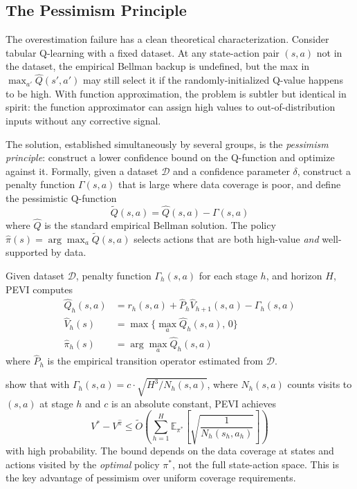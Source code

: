 \subsection{The Pessimism Principle}
\label{sec:pessimism}

The overestimation failure has a clean theoretical characterization. Consider tabular Q-learning with a fixed dataset. At any state-action pair $(s, a)$ not in the dataset, the empirical Bellman backup is undefined, but the max in $\max_{a'} \hat{Q}(s', a')$ may still select it if the randomly-initialized Q-value happens to be high. With function approximation, the problem is subtler but identical in spirit: the function approximator can assign high values to out-of-distribution inputs without any corrective signal.

The solution, established simultaneously by several groups, is the \textit{pessimism principle}: construct a lower confidence bound on the Q-function and optimize against it. Formally, given a dataset $\mathcal{D}$ and a confidence parameter $\delta$, construct a penalty function $\Gamma(s, a)$ that is large where data coverage is poor, and define the pessimistic Q-function
\begin{equation}
\label{eq:pessimistic_q}
\tilde{Q}(s, a) = \hat{Q}(s, a) - \Gamma(s, a)
\end{equation}
where $\hat{Q}$ is the standard empirical Bellman solution. The policy $\hat{\pi}(s) = \arg\max_a \tilde{Q}(s, a)$ selects actions that are both high-value \textit{and} well-supported by data.

\begin{definition}
\label{def:pevi}
Given dataset $\mathcal{D}$, penalty function $\Gamma_h(s,a)$ for each stage $h$, and horizon $H$, PEVI computes
\begin{align}
\hat{Q}_h(s,a) &= r_h(s,a) + \hat{P}_h \hat{V}_{h+1}(s,a) - \Gamma_h(s,a) \\
\hat{V}_h(s) &= \max\{\max_a \hat{Q}_h(s,a), \, 0\} \\
\hat{\pi}_h(s) &= \arg\max_a \hat{Q}_h(s,a)
\end{align}
where $\hat{P}_h$ is the empirical transition operator estimated from $\mathcal{D}$.
\end{definition}

\citet{JinYang2021} show that with $\Gamma_h(s,a) = c \cdot \sqrt{H^3 / N_h(s,a)}$, where $N_h(s,a)$ counts visits to $(s,a)$ at stage $h$ and $c$ is an absolute constant, PEVI achieves
\begin{equation}
\label{eq:pevi_bound}
V^* - V^{\hat{\pi}} \leq \tilde{O}\left(\sum_{h=1}^H \mathbb{E}_{\pi^*}\left[\sqrt{\frac{1}{N_h(s_h, a_h)}}\right]\right)
\end{equation}
with high probability. The bound depends on the data coverage at states and actions visited by the \textit{optimal} policy $\pi^*$, not the full state-action space. This is the key advantage of pessimism over uniform coverage requirements.


